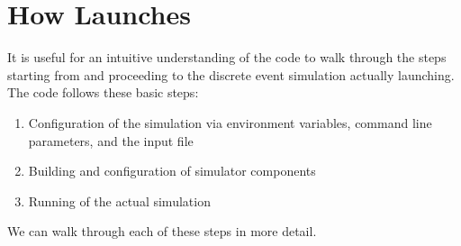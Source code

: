 
\chapter{How \sstmacro Launches}
\label{chapter:launching}

It is useful for an intuitive understanding of the code to walk through the steps starting from  and proceeding to the discrete event simulation actually launching. The code follows these basic steps:

\begin{enumerate}
\item Configuration of the simulation via environment variables, command line parameters, and the input file
\item Building and configuration of simulator components
\item Running of the actual simulation
\end{enumerate}

We can walk through each of these steps in more detail.

